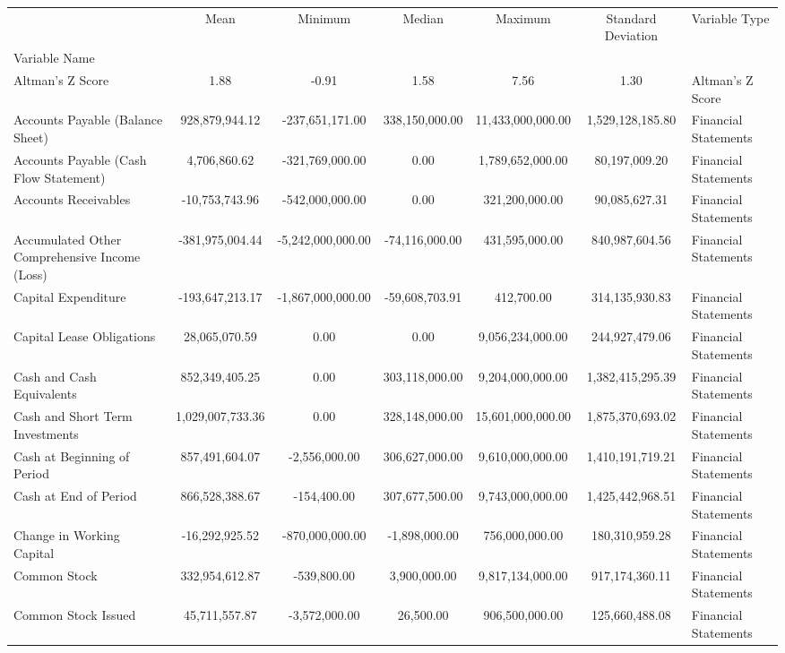 \begin{tabular}{lccccc}
 & Mean & Minimum & Median & Maximum & Standard Deviation & Variable Type \\
Variable Name &  &  &  &  &  &  \\
Altman's Z Score & 1.88 & -0.91 & 1.58 & 7.56 & 1.30 & Altman's Z Score \\
Accounts Payable (Balance Sheet) & 928,879,944.12 & -237,651,171.00 & 338,150,000.00 & 11,433,000,000.00 & 1,529,128,185.80 & Financial Statements \\
Accounts Payable (Cash Flow Statement) & 4,706,860.62 & -321,769,000.00 & 0.00 & 1,789,652,000.00 & 80,197,009.20 & Financial Statements \\
Accounts Receivables & -10,753,743.96 & -542,000,000.00 & 0.00 & 321,200,000.00 & 90,085,627.31 & Financial Statements \\
Accumulated Other Comprehensive Income (Loss) & -381,975,004.44 & -5,242,000,000.00 & -74,116,000.00 & 431,595,000.00 & 840,987,604.56 & Financial Statements \\
Capital Expenditure & -193,647,213.17 & -1,867,000,000.00 & -59,608,703.91 & 412,700.00 & 314,135,930.83 & Financial Statements \\
Capital Lease Obligations & 28,065,070.59 & 0.00 & 0.00 & 9,056,234,000.00 & 244,927,479.06 & Financial Statements \\
Cash and Cash Equivalents & 852,349,405.25 & 0.00 & 303,118,000.00 & 9,204,000,000.00 & 1,382,415,295.39 & Financial Statements \\
Cash and Short Term Investments & 1,029,007,733.36 & 0.00 & 328,148,000.00 & 15,601,000,000.00 & 1,875,370,693.02 & Financial Statements \\
Cash at Beginning of Period & 857,491,604.07 & -2,556,000.00 & 306,627,000.00 & 9,610,000,000.00 & 1,410,191,719.21 & Financial Statements \\
Cash at End of Period & 866,528,388.67 & -154,400.00 & 307,677,500.00 & 9,743,000,000.00 & 1,425,442,968.51 & Financial Statements \\
Change in Working Capital & -16,292,925.52 & -870,000,000.00 & -1,898,000.00 & 756,000,000.00 & 180,310,959.28 & Financial Statements \\
Common Stock & 332,954,612.87 & -539,800.00 & 3,900,000.00 & 9,817,134,000.00 & 917,174,360.11 & Financial Statements \\
Common Stock Issued & 45,711,557.87 & -3,572,000.00 & 26,500.00 & 906,500,000.00 & 125,660,488.08 & Financial Statements \\

\end{tabular}
